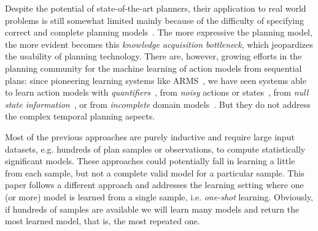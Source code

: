 \documentclass{ecai}
\begin{document}
Despite the potential of state-of-the-art planners, their application to real world problems is still somewhat limited mainly because of the difficulty of specifying correct and complete planning models~\cite{kambhampati2007model}. The more expressive the planning model, the more evident becomes this {\em knowledge acquisition bottleneck}, which jeopardizes the usability of planning technology. There are, however, growing efforts in the planning community for the machine learning of action models from sequential plans: since pioneering learning systems like ARMS~\cite{yang2007learning}, we have seen systems able to learn action models with {\em quantifiers}~\cite{AmirC08,ZhuoYHL10}, from {\em noisy} actions or states~\cite{MouraoZPS12,zhuo2013action}, from {\em null state information}~\cite{cresswell2013}, or from {\em incomplete} domain models~\cite{ZhuoK17,ZhuoNK13}. But they do not address the complex temporal planning aspects.

Most of the previous approaches are purely inductive and require large input datasets, e.g. hundreds of plan samples or observations, to compute statistically significant models. These approaches could potentially fall in learning a little from each sample, but not a complete valid model for a particular sample.
This paper follows a different approach and addresses the learning setting where one (or more) model is learned from a single sample, i.e. {\em one-shot} learning. Obviously, if hundreds of samples are available we will learn many models and return the most learned model, that is, the most repeated one.

\end{document}

